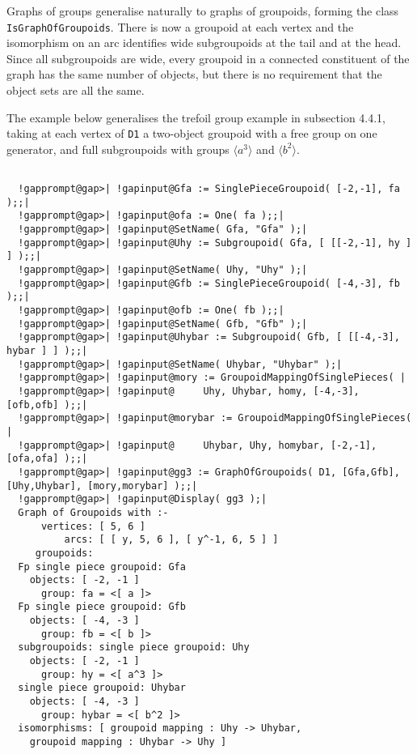 \documentclass[a4paper,11pt]{report}
\begin{document}
{{{ Graphs of groups generalise naturally to graphs of groupoids, forming the
class \texttt{IsGraphOfGroupoids}. There is now a groupoid at each vertex and the isomorphism on an arc
identifies wide subgroupoids at the tail and at the head. Since all
subgroupoids are wide, every groupoid in a connected constituent of the graph
has the same number of objects, but there is no requirement that the object
sets are all the same. 

 The example below generalises the trefoil group example in subsection 4.4.1,
taking at each vertex of \texttt{D1} a two-object groupoid with a free group on one generator, and full
subgroupoids with groups $\langle a^3 \rangle$ and $\langle b^2 \rangle$. 

 }

 
\begin{Verbatim}[commandchars=!@|,fontsize=\small,frame=single,label=Example]
  
  !gapprompt@gap>| !gapinput@Gfa := SinglePieceGroupoid( [-2,-1], fa );;|
  !gapprompt@gap>| !gapinput@ofa := One( fa );;|
  !gapprompt@gap>| !gapinput@SetName( Gfa, "Gfa" );|
  !gapprompt@gap>| !gapinput@Uhy := Subgroupoid( Gfa, [ [[-2,-1], hy ] ] );;|
  !gapprompt@gap>| !gapinput@SetName( Uhy, "Uhy" );|
  !gapprompt@gap>| !gapinput@Gfb := SinglePieceGroupoid( [-4,-3], fb );;|
  !gapprompt@gap>| !gapinput@ofb := One( fb );;|
  !gapprompt@gap>| !gapinput@SetName( Gfb, "Gfb" );|
  !gapprompt@gap>| !gapinput@Uhybar := Subgroupoid( Gfb, [ [[-4,-3], hybar ] ] );;|
  !gapprompt@gap>| !gapinput@SetName( Uhybar, "Uhybar" );|
  !gapprompt@gap>| !gapinput@mory := GroupoidMappingOfSinglePieces( |
  !gapprompt@gap>| !gapinput@     Uhy, Uhybar, homy, [-4,-3], [ofb,ofb] );;|
  !gapprompt@gap>| !gapinput@morybar := GroupoidMappingOfSinglePieces( |
  !gapprompt@gap>| !gapinput@     Uhybar, Uhy, homybar, [-2,-1], [ofa,ofa] );;|
  !gapprompt@gap>| !gapinput@gg3 := GraphOfGroupoids( D1, [Gfa,Gfb], [Uhy,Uhybar], [mory,morybar] );;|
  !gapprompt@gap>| !gapinput@Display( gg3 );|
  Graph of Groupoids with :-
      vertices: [ 5, 6 ]
          arcs: [ [ y, 5, 6 ], [ y^-1, 6, 5 ] ]
     groupoids:
  Fp single piece groupoid: Gfa
    objects: [ -2, -1 ]
      group: fa = <[ a ]>
  Fp single piece groupoid: Gfb
    objects: [ -4, -3 ]
      group: fb = <[ b ]>
  subgroupoids: single piece groupoid: Uhy
    objects: [ -2, -1 ]
      group: hy = <[ a^3 ]>
  single piece groupoid: Uhybar
    objects: [ -4, -3 ]
      group: hybar = <[ b^2 ]>
  isomorphisms: [ groupoid mapping : Uhy -> Uhybar,
    groupoid mapping : Uhybar -> Uhy ]
  

\end{Verbatim}}}
\end{document}
